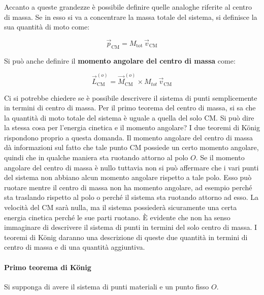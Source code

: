Accanto a queste grandezze è possibile definire quelle analoghe riferite al centro di massa. Se in esso si va a concentrare la massa totale del sistema, si definisce la sua quantità di moto come:

\[
	\vec{p}_\text{CM} = M_\text{tot} \, \vec{v}_\text{CM}
\]

Si può anche definire il \textbf{momento angolare del centro di massa} come:

\[
	\boxed{\vec{L}_\text{CM}^{(o)} = \vec{M}_\text{CM}^{(o)} \times M_{tot} \, \vec{v}_\text{CM}}
\]

Ci si potrebbe chiedere se è possibile descrivere il sistema di punti semplicemente in termini di centro di massa. Per il primo teorema del centro di massa, si sa che la quantità di moto totale del sistema è uguale a quella del solo CM. Si può dire la stessa cosa per l'energia cinetica e il momento angolare? I due teoremi di K\"onig rispondono proprio a questa domanda. Il momento angolare del centro di massa dà informazioni sul fatto che tale punto CM possiede un certo momento angolare, quindi che in qualche maniera sta ruotando attorno al polo $O$. Se il momento angolare del centro di massa è nullo tuttavia non si può affermare che i vari punti del sistema non abbiano alcun momento angolare rispetto a tale polo. Esso può ruotare mentre il centro di massa non ha momento angolare, ad esempio perché sta traslando rispetto al polo o perché il sistema sta ruotando attorno ad esso. La velocità del CM sarà nulla, ma il sistema possiederà sicuramente una certa energia cinetica perché le sue parti ruotano. È evidente che non ha senso immaginare di descrivere il sistema di punti in termini del solo centro di massa. I teoremi di K\"onig daranno una descrizione di queste due quantità in termini di centro di massa e di una quantità aggiuntiva.

\paragraph{Primo teorema di K\"onig} Si supponga di avere il sistema di punti materiali e un punto fisso $O$.

